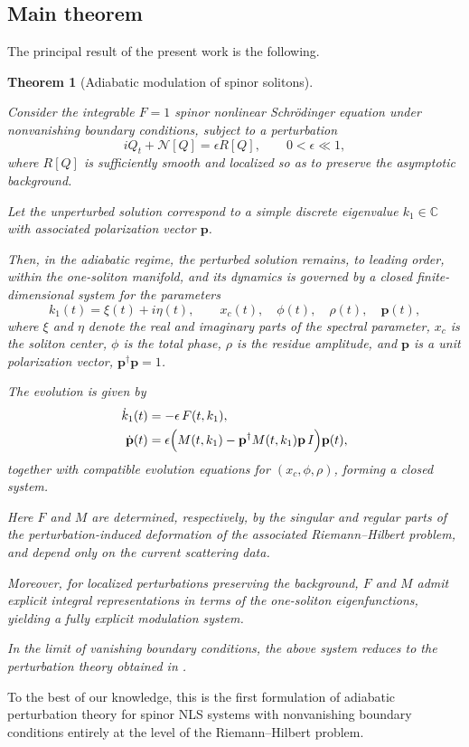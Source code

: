 \documentclass[11pt]{amsart}
\newtheorem{theorem}{Theorem}[section]
\theoremstyle{definition}
\numberwithin{equation}{section}
\begin{document}
\subsection*{Main theorem}

The principal result of the present work is the following.

\begin{theorem}[Adiabatic modulation of spinor solitons]
\label{thm_main_intro}

Consider the integrable $F=1$ spinor nonlinear Schr\"odinger equation under nonvanishing boundary conditions, subject to a perturbation
\[
iQ_t + \mathcal{N}[Q] = \epsilon R[Q], 
\qquad 0<\epsilon\ll1,
\]
where $R[Q]$ is sufficiently smooth and localized so as to preserve the asymptotic background.

Let the unperturbed solution correspond to a simple discrete eigenvalue $k_1 \in \mathbb{C}$ with associated polarization vector $\mathbf{p}$.

Then, in the adiabatic regime, the perturbed solution remains, to leading order, within the one-soliton manifold, and its dynamics is governed by a closed finite-dimensional system for the parameters
\[
k_1(t)=\xi(t)+i\eta(t), 
\qquad x_c(t), \quad \phi(t), \quad \rho(t), \quad \mathbf{p}(t),
\]
where $\xi$ and $\eta$ denote the real and imaginary parts of the spectral parameter, $x_c$ is the soliton center, $\phi$ is the total phase, $\rho$ is the residue amplitude, and $\mathbf{p}$ is a unit polarization vector, $\mathbf{p}^\dagger \mathbf{p}=1$.

The evolution is given by
\begin{align}
\dot{k}_1(t) &= -\epsilon\, F(t,k_1), \\
\dot{\mathbf{p}}(t) &= \epsilon\Bigl(M(t,k_1) - \mathbf{p}^\dagger M(t,k_1)\mathbf{p}\, I\Bigr)\mathbf{p}(t),
\end{align}
together with compatible evolution equations for $(x_c,\phi,\rho)$, forming a closed system.

Here $F$ and $M$ are determined, respectively, by the singular and regular parts of the perturbation-induced deformation of the associated Riemann--Hilbert problem, and depend only on the current scattering data.

Moreover, for localized perturbations preserving the background, $F$ and $M$ admit explicit integral representations in terms of the one-soliton eigenfunctions, yielding a fully explicit modulation system.

In the limit of vanishing boundary conditions, the above system reduces to the perturbation theory obtained in \cite{Doktorov2008}.

\end{theorem}
To the best of our knowledge, this is the first formulation of adiabatic perturbation theory for spinor NLS systems with nonvanishing boundary conditions entirely at the level of the Riemann–Hilbert problem.
\end{document}
